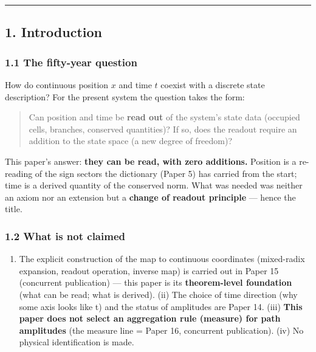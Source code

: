 \documentclass[
]{ltjsarticle}
\providecommand{\tightlist}{%
  \setlength{\itemsep}{0pt}\setlength{\parskip}{0pt}}
\begin{document}
\begin{center}\rule{0.5\linewidth}{0.5pt}\end{center}

\subsection{1. Introduction}\label{introduction}

\subsubsection{1.1 The fifty-year
question}\label{the-fifty-year-question}

How do continuous position \(x\) and time \(t\) coexist with a discrete
state description? For the present system the question takes the form:

\begin{quote}
Can position and time be \textbf{read out} of the system's state data
(occupied cells, branches, conserved quantities)? If so, does the
readout require an addition to the state space (a new degree of
freedom)?
\end{quote}

This paper's answer: \textbf{they can be read, with zero additions.}
Position is a re-reading of the sign sectors the dictionary (Paper 5)
has carried from the start; time is a derived quantity of the conserved
norm. What was needed was neither an axiom nor an extension but a
\textbf{change of readout principle} --- hence the title.

\subsubsection{1.2 What is not claimed}\label{what-is-not-claimed}

\begin{enumerate}
\def\labelenumi{(\roman{enumi})}
\tightlist
\item
  The explicit construction of the map to continuous coordinates
  (mixed-radix expansion, readout operation, inverse map) is carried out
  in Paper 15 (concurrent publication) --- this paper is its
  \textbf{theorem-level foundation} (what can be read; what is derived).
  (ii) The choice of time direction (why some axis looks like t) and the
  status of amplitudes are Paper 14. (iii) \textbf{This paper does not
  select an aggregation rule (measure) for path amplitudes} (the measure
  line = Paper 16, concurrent publication). (iv) No physical
  identification is made.
\end{enumerate}
\end{document}
